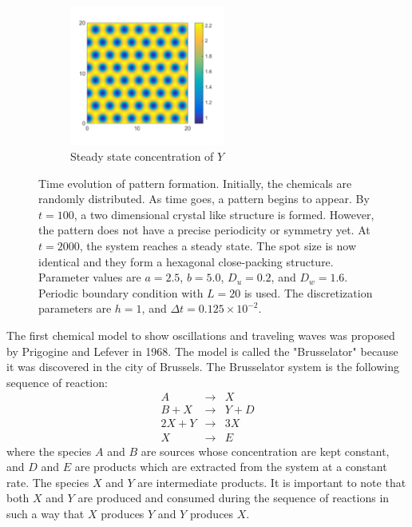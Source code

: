 \begin{figure}
	\begin{subfigure}{0.45\textwidth}
		\centering
		\includegraphics[width=2in]{13.pde1/spots-w.pdf}
		\caption{Steady state concentration of $Y$}	
		\label{fig:spots-w}
	\end{subfigure}
\caption{Time evolution of pattern formation.  Initially, the chemicals are randomly distributed. As time goes, a pattern begins to appear.  By $t=100$, a two dimensional crystal like structure is formed.  However, the pattern does not have a precise periodicity or symmetry yet. At $t=2000$, the system reaches a steady state.  The spot size is now identical and they form a hexagonal close-packing structure.  Parameter values are $a=2.5$, $b=5.0$, $D_u=0.2$, and $D_w=1.6$. Periodic boundary condition with $L=20$ is used. The discretization parameters are $h=1$, and $\Delta t=0.125\times 10^{-2}$.}
\label{fig:spots-evolution}
\end{figure}

The first chemical model to show oscillations and traveling waves was proposed
by Prigogine and Lefever\cite{prigogine68} in 1968.  The model is called the
"Brusselator"  because it was discovered in the city of Brussels.
The Brusselator system is the 
following sequence of reaction:
\begin{subequations}
\label{reactions} 
\begin{eqnarray}
A &\longrightarrow& X \\ 
B + X &\longrightarrow& Y + D \\
2X + Y &\longrightarrow& 3X \\ 
X &\longrightarrow& E
\end{eqnarray}
\end{subequations}
where the species $A$ and $B$ are sources whose concentration are kept
constant, and $D$ and $E$ are products which are extracted from the system at a
constant rate. The species $X$ and $Y$ are intermediate products. 
It is important to note that both $X$ and $Y$ are produced and
consumed during the sequence of reactions in such a way that $X$
produces $Y$ and $Y$ produces $X$.

